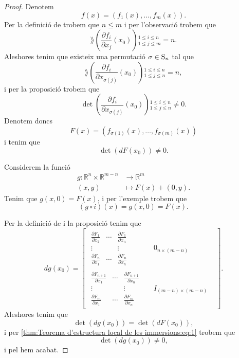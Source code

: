 \documentclass[../Apunts.tex]{subfiles}
\begin{document}
	\begin{proof}
		Denotem
		\[f(x)=(f_{1}(x),\dots,f_{m}(x)).\]
		Per la definició de  trobem que \(n\leq m\) i per l'observació  trobem que
		\[\rang\left(\frac{\partial f_{i}}{\partial x_{j}}(x_{0})\right){}_{1\leq j\leq m}^{1\leq i\leq n}=n.\]
		Aleshores tenim que existeix una permutació \(\sigma\in\operatorname{S}_{n}\) tal que
		\[\rang\left(\frac{\partial f_{i}}{\partial x_{\sigma(j)}}(x_{0})\right){}_{1\leq j\leq n}^{1\leq i\leq n}=n,\]
		i per la proposició  trobem que
		\[\det\left(\frac{\partial f_{i}}{\partial x_{\sigma(j)}}(x_{0})\right){}_{1\leq j\leq n}^{1\leq i\leq n}\neq0.\]
		Denotem doncs
		\[F(x)=(f_{\sigma(1)}(x),\dots,f_{\sigma(m)}(x))\]
		i tenim que
		\begin{equation}
			\label{thm:Teorema d'estructura local de les immersions:eq:1}
			\det(dF(x_{0}))\neq0.
		\end{equation}
		
		Considerem la funció
		\begin{align*}
			g\colon\mathbb{R}^{n}\times\mathbb{R}^{m-n}&\longrightarrow\mathbb{R}^{m} \\
			(x,y)&\longmapsto F(x)+(0,y).
		\end{align*}
		Tenim que \(g(x,0)=F(x)\), i per l'exemple  trobem que
		\[(g\circ i)(x)=g(x,0)=F(x).\]
		
		Per la definició de  i la proposició  tenim que
		\[dg(x_{0})=\left[\begin{array}{c|ccc}
			\begin{matrix}
				\frac{\partial F_{1}}{\partial x_{1}} & \cdots & \frac{\partial F_{1}}{\partial x_{n}} \\
				\vdots & & \vdots \\
				\frac{\partial F_{n}}{\partial x_{1}} & \cdots & \frac{\partial F_{n}}{\partial x_{n}}
			\end{matrix} & & 0_{n\times(m-n)} & \\ \hline
			\begin{matrix}
				\frac{\partial F_{n+1}}{\partial x_{1}} & \cdots & \frac{\partial F_{n+1}}{\partial x_{n}} \\
				\vdots & & \vdots \\
				\frac{\partial F_{m}}{\partial x_{1}} & \cdots & \frac{\partial F_{m}}{\partial x_{n}}
			\end{matrix} & & I_{(m-n)\times(m-n)} &
		\end{array}\right].\]
		Aleshores tenim que
		\[\det(dg(x_{0}))=\det(dF(x_{0})),\]
		i per \eqref{thm:Teorema d'estructura local de les immersions:eq:1} trobem que
		\[\det(dg(x_{0}))\neq0,\]
		i pel  hem acabat.
	\end{proof}
\end{document}

